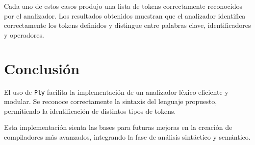 \documentclass[a4paper,12pt]{article}
\begin{document}
Cada uno de estos casos produjo una lista de tokens correctamente reconocidos por el analizador. Los resultados obtenidos muestran que el analizador identifica correctamente los tokens definidos y distingue entre palabras clave, identificadores y operadores.

\section{Conclusión}
El uso de \texttt{Ply} facilita la implementación de un analizador léxico eficiente y modular. Se reconoce correctamente la sintaxis del lenguaje propuesto, permitiendo la identificación de distintos tipos de tokens. 

Esta implementación sienta las bases para futuras mejoras en la creación de compiladores más avanzados, integrando la fase de análisis sintáctico y semántico.
\end{document}

